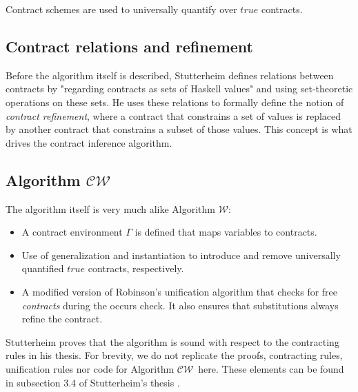 \documentclass[10pt]{report}
\newcommand{\W}{$\mathcal{W}$}
\newcommand{\CW}{$\mathcal{CW}$}
\begin{document}
Contract schemes are used to universally quantify over $true$ contracts.

\subsection{Contract relations and refinement}

Before the algorithm itself is described, Stutterheim defines relations between contracts by "regarding contracts as sets of Haskell values" and using set-theoretic operations on these sets.
He uses these relations to formally define the notion of \textit{contract refinement}, where a contract that constrains a set of values is replaced by another contract that constrains a subset of those values.
This concept is what drives the contract inference algorithm.

\subsection{Algorithm \CW}
The algorithm itself is very much alike Algorithm \W:

\begin{itemize}
	\item A contract environment $\Gamma$ is defined that maps variables to contracts.
	\item Use of generalization and instantiation to introduce and remove universally quantified $true$ contracts, respectively.
	\item A modified version of Robinson's unification algorithm that checks for free \textit{contracts} during the occurs check. It also ensures that substitutions always refine the contract.
\end{itemize}

Stutterheim proves that the algorithm is sound with respect to the contracting rules in his thesis.
For brevity, we do not replicate the proofs, contracting rules, unification rules nor code for Algorithm \CW ~here.
These elements can be found in subsection 3.4 of Stutterheim's thesis \cite{Stutterheim:2013:thesis}.
\end{document}
